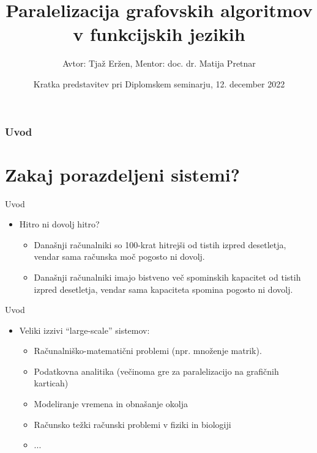 \documentclass{beamer}
\title[]
{Paralelizacija grafovskih algoritmov v funkcijskih jezikih}
\author[]
{Avtor: Tja\v z Er\v zen, Mentor: doc. dr. Matija Pretnar}
\date[12. december 2022] %
{Kratka predstavitev pri Diplomskem seminarju, 12. december 2022}
\begin{document}
\begin{frame}
  \titlepage
\end{frame}

\begin{frame}
  \frametitle{Uvod}
  \tableofcontents
\end{frame}

\section{Zakaj porazdeljeni sistemi?}

\begin{frame}{Uvod}
    \begin{itemize}
        \item Hitro ni dovolj hitro?
        \begin{itemize}
            \item Dana\v snji ra\v cunalniki so 100-krat hitrej\v si od tistih izpred desetletja, vendar sama ra\v cunska mo\v c pogosto ni dovolj.
            \item Dana\v snji ra\v cunalniki imajo bistveno ve\v c spominskih kapacitet od tistih izpred desetletja, vendar sama kapaciteta spomina pogosto ni dovolj.
        \end{itemize}
    \end{itemize}
\end{frame}

\begin{frame}{Uvod}
    \begin{itemize}
        \item Veliki izzivi ``large-scale'' sistemov:
        \begin{itemize}
            \item Ra\v cunalni\v sko-matemati\v cni problemi (npr. mno\v zenje matrik).
            \item Podatkovna analitika (ve\v cinoma gre za paralelizacijo na grafi\v cnih karticah)
            \item Modeliranje vremena in obna\v sanje okolja
            \item Ra\v cunsko te\v zki ra\v cunski problemi v fiziki in biologiji
            \item ...
        \end{itemize}
    \end{itemize}
\end{frame}
\end{document}
